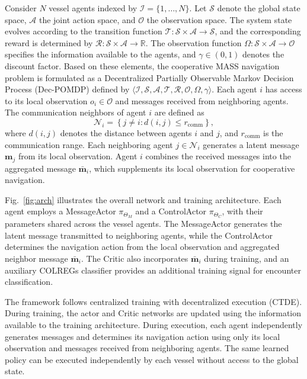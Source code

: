 \documentclass[final,5p,times,twocolumn]{elsarticle}
\begin{document}
{Consider $N$ vessel agents indexed by
$\mathcal{I}=\{1,\ldots,N\}$. Let $\mathcal{S}$ denote the global state
space, $\mathcal{A}$ the joint action space, and $\mathcal{O}$ the
observation space. The system state evolves according to the transition
function
$\mathcal{T}:\mathcal{S}\times\mathcal{A}\rightarrow\mathcal{S}$,
and the corresponding reward is determined by
$\mathcal{R}:\mathcal{S}\times\mathcal{A}\rightarrow\mathbb{R}$.
The observation function
$\Omega:\mathcal{S}\times\mathcal{A}\rightarrow\mathcal{O}$
specifies the information available to the agents, and
$\gamma\in(0,1)$ denotes the discount factor. Based on these elements,
the cooperative MASS navigation problem is formulated as a
Decentralized Partially Observable Markov Decision Process (Dec-POMDP)
defined by
$\langle\mathcal{I},\mathcal{S},\mathcal{A},\mathcal{T},
\mathcal{R},\mathcal{O},\Omega,\gamma\rangle$.
Each agent $i$ has access to its local observation
$o_i\in\mathcal{O}$ and messages received from neighboring agents.
The communication neighbors of agent $i$ are defined as
\begin{equation}
\mathcal{N}_i
=
\left\{
j\neq i : d(i,j)\leq r_{\mathrm{comm}}
\right\},
\end{equation}
where $d(i,j)$ denotes the distance between agents $i$ and $j$, and
$r_{\mathrm{comm}}$ is the communication range. Each neighboring agent
$j\in\mathcal{N}_i$ generates a latent message $\mathbf{m}_j$ from its
local observation. Agent $i$ combines the received messages into the
aggregated message $\bar{\mathbf{m}}_i$, which supplements its local
observation for cooperative navigation.

Fig.~\ref{fig:arch} illustrates the overall network and
training architecture. Each agent employs a MessageActor
$\pi_{\Theta_M}$ and a ControlActor $\pi_{\Theta_C}$, with their
parameters shared across the vessel agents. The MessageActor generates
the latent message transmitted to neighboring agents, while the
ControlActor determines the navigation action from the local observation
and aggregated neighbor message $\bar{\mathbf{m}}_i$. The Critic also
incorporates $\bar{\mathbf{m}}_i$ during training, and an auxiliary
COLREGs classifier provides an additional training signal for encounter
classification.

The framework follows centralized training with decentralized execution
(CTDE). During training, the actor and Critic networks are updated using
the information available to the training architecture. During execution,
each agent independently generates messages and determines its navigation
action using only its local observation and messages received from
neighboring agents. The same learned policy can be executed
independently by each vessel without access to the global state.
}
\end{document}
